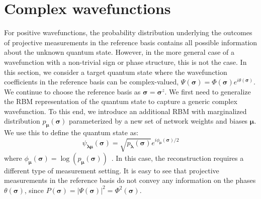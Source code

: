 \documentclass[submission, Phys, hidelnks]{SciPost}
\begin{document}
\section{Complex wavefunctions}\label{sec:complex}
For positive wavefunctions, the probability distribution underlying the outcomes
of projective measurements in the reference basis  contains all possible
information about the unknown quantum state.
However, in the more general case of a wavefunction with a non-trivial sign or
phase structure, this is not the case.
In this section, we consider a target quantum state where the wavefunction
coefficients in the reference basis can be
complex-valued, $\Psi(\bm{\sigma})=\Phi(\bm{\sigma})e^{i\theta(\bm{\sigma})}$.
We continue to choose the reference basis as $\bm{\sigma} = \bm{\sigma}^z$.
We first need to generalize the RBM representation of the quantum state to
capture a generic complex wavefunction. To this end, we introduce an additional RBM
with marginalized distribution $p_{\bm{\mu}}(\bm{\sigma})$ parameterized by a
new set of network weights and biases $\bm{\mu}$.
We use this to define the quantum state as:
\begin{equation}
    \psi_{\bm{\lambda} \bm{\mu}} (\bm{\sigma})= \sqrt{p_{\bm{\lambda}} (\bm{\sigma})} e^{i \phi_{\bm{\mu}} (\bm{\sigma})/2}
\end{equation}
where $\phi_{\bm{\mu}}(\bm{\sigma}) = \log (p_{\bm{\mu}} (\bm{\sigma}))$~\cite{torlai_neural-network_2018}.
In this case, the reconstruction requires a different type of measurement
setting. It is easy to see that projective measurements in the reference basis
do not convey any information on the phases $\theta(\bm{\sigma})$, since
$P(\bm{\sigma})=|\Psi(\bm{\sigma})|^2=\Phi^2(\bm{\sigma})$.
\end{document}
